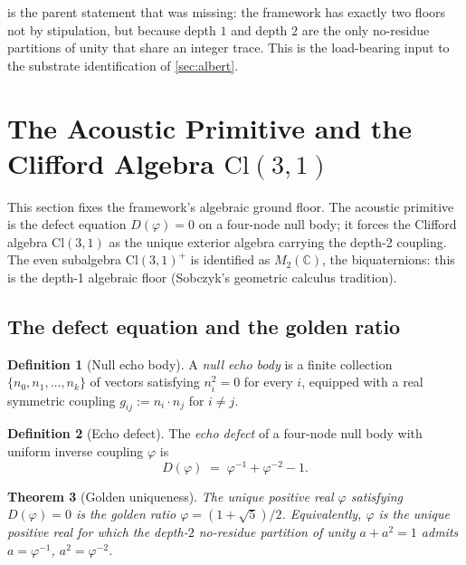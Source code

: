 \documentclass[11pt,a4paper]{article}
\theoremstyle{plain}
\newtheorem{theorem}{Theorem}[section]
\theoremstyle{definition}
\newtheorem{definition}[theorem]{Definition}
\theoremstyle{remark}
\numberwithin{equation}{section}
\providecommand{\Cl}{\mathrm{Cl}}
\providecommand{\C}{\mathbb{C}}
\providecommand{\vp}{\varphi}
\begin{document}
 is the parent statement that
\cite{seam-paper} was missing: the framework has exactly two
floors not by stipulation, but because depth $1$ and depth $2$ are
the only no-residue partitions of unity that share an integer
trace.  This is the load-bearing input to the substrate
identification of \cref{sec:albert}.

\section{The Acoustic Primitive and the Clifford Algebra \texorpdfstring{$\Cl(3,1)$}{Cl(3,1)}}
\label{sec:clifford}

This section fixes the framework's algebraic ground floor.  The
acoustic primitive is the defect equation $D(\vp) = 0$ on a
four-node null body; it forces the Clifford algebra $\Cl(3,1)$ as
the unique exterior algebra carrying the depth-2 coupling.  The
even subalgebra $\Cl(3,1)^+$ is identified as $M_2(\C)$, the
biquaternions: this is the depth-1 algebraic floor (Sobczyk's
geometric calculus tradition).

\subsection{The defect equation and the golden ratio}

\begin{definition}[Null echo body]
\label{def:null-body}
A \emph{null echo body} is a finite collection
$\{n_0, n_1, \ldots, n_k\}$ of vectors satisfying $n_i^2 = 0$ for
every $i$, equipped with a real symmetric coupling
$g_{ij} := n_i \cdot n_j$ for $i \ne j$.
\end{definition}

\begin{definition}[Echo defect]
\label{def:defect}
The \emph{echo defect} of a four-node null body with uniform
inverse coupling $\vp$ is
\[
  D(\vp) \;=\; \vp^{-1} + \vp^{-2} - 1.
\]
\end{definition}

\begin{theorem}[Golden uniqueness]
\label{thm:golden-uniqueness}
The unique positive real $\vp$ satisfying $D(\vp) = 0$ is the
golden ratio $\vp = (1 + \sqrt 5)/2$.  Equivalently, $\vp$ is the
unique positive real for which the depth-$2$ no-residue partition
of unity $a + a^2 = 1$ admits $a = \vp^{-1}$, $a^2 = \vp^{-2}$.
\end{theorem}
\end{document}
